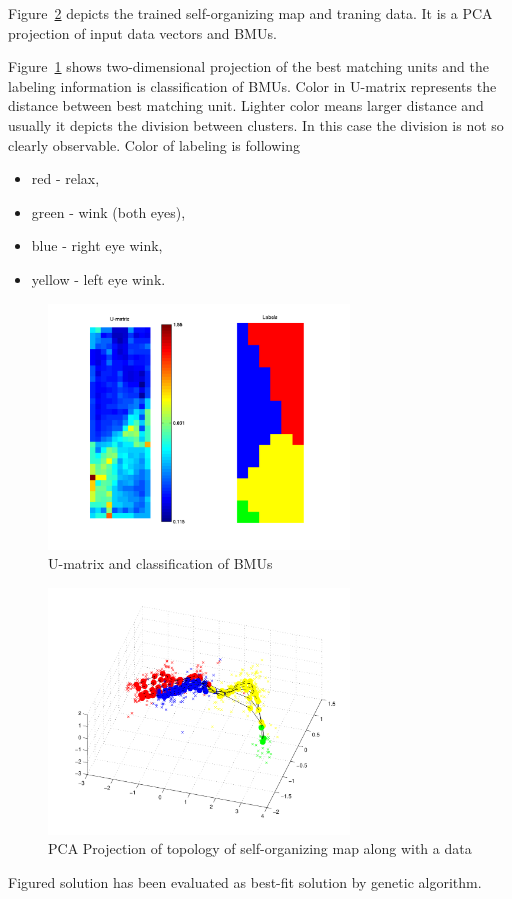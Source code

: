 \documentclass[a4paper,jurnal]{IEEEtran}
\begin{document}
Figure~\ref{som_topol_proj} depicts the trained self-organizing map and traning data.
It is a PCA projection of input data vectors and BMUs.

Figure~\ref{som_umat} shows two-dimensional projection of the best matching units and
the labeling information is classification of BMUs. 
Color in U-matrix represents the distance between best matching unit. Lighter color
means larger distance and usually it depicts the division between clusters. In this case
the division is not so clearly observable. Color of labeling is following
\begin{itemize}
	\item  red - relax,
	\item green - wink (both eyes),
	\item blue - right eye wink,
	\item yellow - left eye wink.
\end{itemize}

\begin{figure}[h]
	\centering
	\includegraphics[width=80mm]{som_umat}
	\caption{U-matrix and classification of BMUs}
	\label{som_umat}
\end{figure}
\begin{figure}[h]
	\centering
	\includegraphics[width=80mm]{som_topol_proj}
	\caption{PCA Projection of topology of self-organizing map along with a data}
	\label{som_topol_proj}
\end{figure}
Figured solution has been evaluated as best-fit solution by genetic algorithm.
\end{document}
